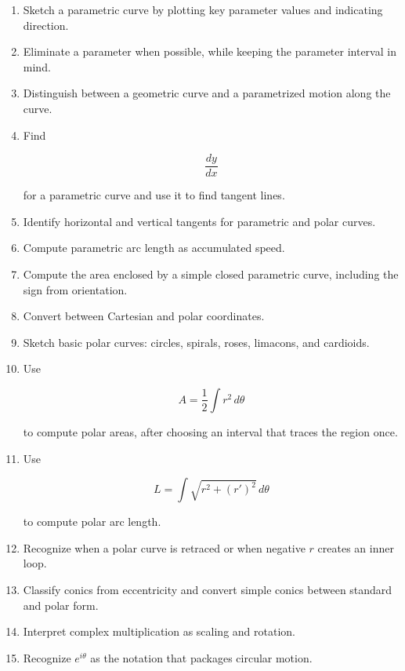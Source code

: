 \begin{enumerate}
\item Sketch a parametric curve by plotting key parameter values and indicating direction.

\item Eliminate a parameter when possible, while keeping the parameter interval in mind.

\item Distinguish between a geometric curve and a parametrized motion along the curve.

\item Find

\[
\frac{dy}{dx}
\]

for a parametric curve and use it to find tangent lines.

\item Identify horizontal and vertical tangents for parametric and polar curves.

\item Compute parametric arc length as accumulated speed.

\item Compute the area enclosed by a simple closed parametric curve, including the sign
from orientation.

\item Convert between Cartesian and polar coordinates.

\item Sketch basic polar curves: circles, spirals, roses, limacons, and cardioids.

\item Use

\[
A=\frac12\int r^2\,d\theta
\]

to compute polar areas, after choosing an interval that traces the region once.

\item Use

\[
L=\int \sqrt{r^2+(r')^2}\,d\theta
\]

to compute polar arc length.

\item Recognize when a polar curve is retraced or when negative \(r\) creates an inner loop.

\item Classify conics from eccentricity and convert simple conics between standard and polar form.

\item Interpret complex multiplication as scaling and rotation.

\item Recognize \(e^{i\theta}\) as the notation that packages circular motion.
\end{enumerate}

